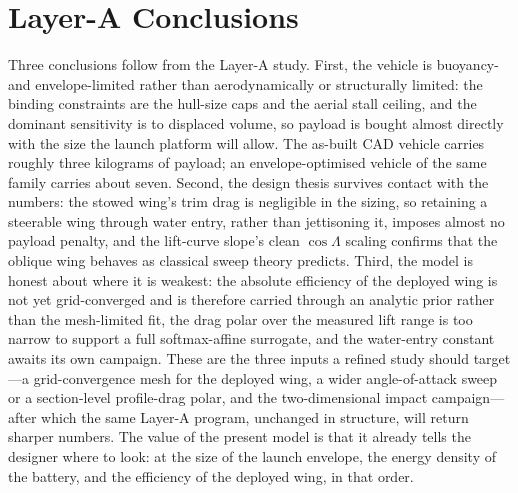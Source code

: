 \documentclass[conf]{new-aiaa}
\begin{document}
\section{Layer-A Conclusions}

Three conclusions follow from the Layer-A study. First, the vehicle is buoyancy- and
envelope-limited rather than aerodynamically or structurally limited: the binding constraints are the
hull-size caps and the aerial stall ceiling, and the dominant sensitivity is to displaced volume, so
payload is bought almost directly with the size the launch platform will allow. The as-built CAD
vehicle carries roughly three kilograms of payload; an envelope-optimised vehicle of the same family
carries about seven. Second, the design thesis survives contact with the numbers: the stowed wing's
trim drag is negligible in the sizing, so retaining a steerable wing through water entry, rather than
jettisoning it, imposes almost no payload penalty, and the lift-curve slope's clean $\cos\Lambda$
scaling confirms that the oblique wing behaves as classical sweep theory predicts. Third, the model
is honest about where it is weakest: the absolute efficiency of the deployed wing is not yet
grid-converged and is therefore carried through an analytic prior rather than the mesh-limited fit,
the drag polar over the measured lift range is too narrow to support a full softmax-affine surrogate,
and the water-entry constant awaits its own campaign. These are the three inputs a refined study
should target---a grid-convergence mesh for the deployed wing, a wider angle-of-attack sweep or a
section-level profile-drag polar, and the two-dimensional impact campaign---after which the same
Layer-A program, unchanged in structure, will return sharper numbers. The value of the present model
is that it already tells the designer where to look: at the size of the launch envelope, the energy
density of the battery, and the efficiency of the deployed wing, in that order.


\end{document}
